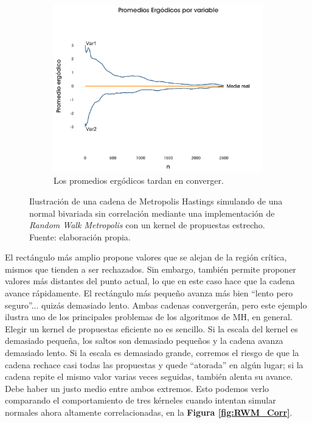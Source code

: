 \begin{figure}[h]
\begin{subfigure}{0.3\textwidth}
    \end{subfigure}
    ~
    \begin{subfigure}{0.3\textwidth}
        \includegraphics[width=\textwidth]{Figs/Bayes/Ejemplo2_RWM_C}
        \caption{Los promedios ergódicos tardan en converger.}
    \end{subfigure}
    \caption{Ilustración de una cadena de Metropolis Hastings simulando de una normal bivariada sin correlación mediante una implementación de \textit{Random Walk Metropolis} con un kernel de propuestas estrecho. Fuente: elaboración propia.}\label{fig:RWM2}
\end{figure}

El rectángulo más amplio propone valores que se alejan de la región crítica, mismos que tienden a ser rechazados. Sin embargo, también permite proponer valores más distantes del punto actual, lo que en este caso hace que la cadena avance rápidamente. El rectángulo más pequeño avanza más bien ``lento pero seguro''... quizás demasiado lento. Ambas cadenas convergerán, pero este ejemplo ilustra uno de los principales problemas de los algoritmos de MH, en general. Elegir un kernel de propuestas eficiente no es sencillo. Si la escala del kernel es demasiado pequeña, los saltos son demasiado pequeños y la cadena avanza demasiado lento. Si la escala es demasiado grande, corremos el riesgo de que la cadena rechace casi todas las propuestas y quede ``atorada'' en algún lugar; si la cadena repite el mismo valor varias veces seguidas, también alenta su avance. Debe haber un justo medio entre ambos extremos. Esto podemos verlo comparando el comportamiento de tres kérneles cuando intentan simular normales ahora altamente correlacionadas, en la \textbf{Figura \ref{fig:RWM_Corr}}.\\ 

